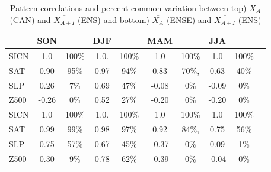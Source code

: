 \documentclass[12pt]{article}
\begin{document}
\begin{table}[t]
\caption{Pattern correlations and percent common variation between top) $X_A$ (CAN) and $\overline{X_{A+I}}$ (ENS) and bottom) $\overline{X_{A}}$ (ENSE) and $\overline{X_{A+I}}$ (ENS)}\label{tbl:corrs}
\begin{center}
\begin{tabular}{l|cc|cc|cc|ccc}
\hline\hline
           & SON      &                 & DJF &                & MAM &       & JJA &    \\
\hline
SICN & 1.0       &  100\%    & 1.0.    & 100\% & 1.0       &  100\% & 1.0    &  100\% \\
SAT  & 0.90        &  95\%        & 0.97    & 94\%   & 0.83    & 70\%,   &  0.63   &   40\%  \\
SLP &  0.26      &   7\%       & 0.69  &  47\%      & -0.08    & 0\%      &  -0.09  & 0\%   \\
Z500   & -0.26  & 0\%        & 0.52     & 27\%      &  -0.20  & 0\%      &  -0.20 & 0\% \\
\hline
\hline
SICN & 1.0       &  100\%    & 1.0.    & 100\% & 1.0       &  100\% & 1.0    &  100\% \\
SAT  & 0.99        &  99\%        & 0.98    & 97\%   & 0.92    & 84\%,   &  0.75   &   56\%  \\
SLP &  0.75      &   57\%       & 0.67  &  45\%      & -0.37    & 0\%      &  0.09  & 1\%   \\
Z500   & 0.30   & 9\%        & 0.78     & 62\%      &  -0.39  & 0\%      &  -0.04 & 0\% \\
\hline
\end{tabular}
\end{center}
\end{table}





\end{document}
